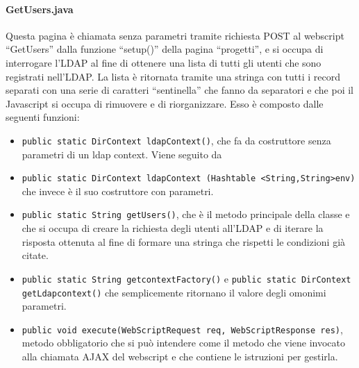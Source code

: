 \paragraph{GetUsers.java}
Questa pagina è chiamata senza parametri tramite richiesta POST al webscript “GetUsers” dalla funzione “setup()” della pagina “progetti”, e si occupa di interrogare l’LDAP al fine di ottenere una lista di tutti gli utenti che sono registrati nell’LDAP. La lista è ritornata tramite una stringa con tutti i record separati con una serie di caratteri “sentinella” che fanno da separatori e che poi il Javascript si occupa di rimuovere e di riorganizzare. Esso è composto dalle seguenti funzioni:
\begin{itemize}
\item \texttt{public static DirContext ldapContext()}, che fa da costruttore senza parametri di un ldap context. Viene seguito da
\item \texttt{public static DirContext ldapContext (Hashtable <String,String>env)} che invece è il suo costruttore con parametri.
\item \texttt{public static String getUsers()}, che è il metodo principale della classe e che si occupa di creare la richiesta degli utenti all’LDAP e di iterare la risposta ottenuta al fine di formare una stringa che rispetti le condizioni già citate.
\item \texttt{public static String getcontextFactory()} e \texttt{public static DirContext getLdapcontext()} che  semplicemente ritornano il valore degli omonimi  parametri.
\item \texttt{public void execute(WebScriptRequest req, WebScriptResponse res)}, metodo obbligatorio che si può intendere come il metodo che viene invocato alla chiamata AJAX del webscript e che contiene le istruzioni per gestirla.
\end{itemize}
